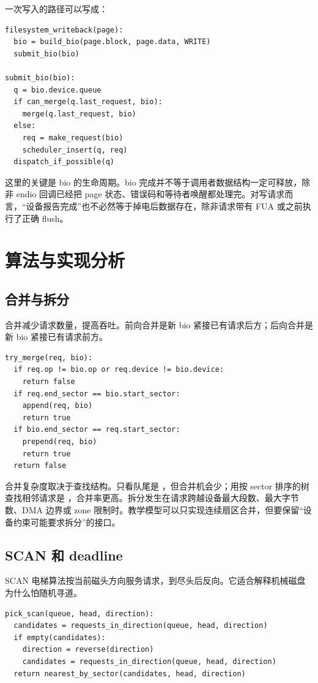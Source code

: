 一次写入的路径可以写成：

\begin{lstlisting}
filesystem_writeback(page):
  bio = build_bio(page.block, page.data, WRITE)
  submit_bio(bio)

submit_bio(bio):
  q = bio.device.queue
  if can_merge(q.last_request, bio):
    merge(q.last_request, bio)
  else:
    req = make_request(bio)
    scheduler_insert(q, req)
  dispatch_if_possible(q)
\end{lstlisting}

这里的关键是 bio 的生命周期。bio 完成并不等于调用者数据结构一定可释放，除非 endio 回调已经把 page 状态、错误码和等待者唤醒都处理完。对写请求而言，“设备报告完成”也不必然等于掉电后数据存在，除非请求带有 FUA 或之前执行了正确 flush。

\section{算法与实现分析}

\subsection{合并与拆分}

合并减少请求数量，提高吞吐。前向合并是新 bio 紧接已有请求后方；后向合并是新 bio 紧接已有请求前方。

\begin{lstlisting}
try_merge(req, bio):
  if req.op != bio.op or req.device != bio.device:
    return false
  if req.end_sector == bio.start_sector:
    append(req, bio)
    return true
  if bio.end_sector == req.start_sector:
    prepend(req, bio)
    return true
  return false
\end{lstlisting}

合并复杂度取决于查找结构。只看队尾是 ，但合并机会少；用按 sector 排序的树查找相邻请求是 ，合并率更高。拆分发生在请求跨越设备最大段数、最大字节数、DMA 边界或 zone 限制时。教学模型可以只实现连续扇区合并，但要保留“设备约束可能要求拆分”的接口。

\subsection{SCAN 和 deadline}

SCAN 电梯算法按当前磁头方向服务请求，到尽头后反向。它适合解释机械磁盘为什么怕随机寻道。

\begin{lstlisting}
pick_scan(queue, head, direction):
  candidates = requests_in_direction(queue, head, direction)
  if empty(candidates):
    direction = reverse(direction)
    candidates = requests_in_direction(queue, head, direction)
  return nearest_by_sector(candidates, head, direction)
\end{lstlisting}

